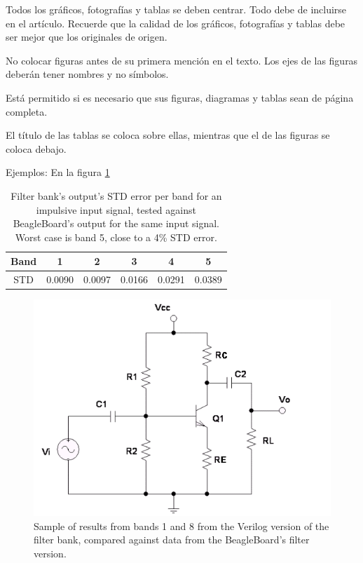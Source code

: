 \documentclass[journal,onecolumn]{IEEEtran}
\begin{document}
Todos los gráficos, fotografías y tablas se deben centrar. Todo debe de incluirse en el artículo. Recuerde que la calidad de los gráficos, fotografías y tablas debe ser mejor que los originales de origen.

No colocar figuras antes de su primera mención en el texto. Los ejes de las figuras deberán tener nombres y no símbolos.

Está permitido si es necesario que sus figuras, diagramas y tablas sean de página completa.

El título de las tablas se coloca sobre ellas, mientras que el de las figuras se coloca debajo.

Ejemplos: En la figura \ref{fig:FiguraCircuito}


\begin{table}[htb]
  \begin{center}
    \caption{Filter bank's output's STD error per band for an impulsive input signal, tested against BeagleBoard's output for the same input signal. Worst case is band 5, close to a 4\% STD error. }
    \label{tab:filter-error}
   
   \begin{tabular}{c | c | c | c | c | c }
      \hline
      Band & 1 & 2 & 3 & 4 & 5 \\
      \hline
       STD & 0.0090 & 0.0097 & 0.0166 & 0.0291 & 0.0389  \\
      \hline
    \end{tabular}
  \end{center}
\end{table}

\begin{figure}[hbtp]
	\centering
	\includegraphics[width = \columnwidth]{imagenes/Circuito.png}
	\caption[Figura3]{Sample of results from bands 1 and 8 from the Verilog version of the filter bank, compared against data from the BeagleBoard's filter version.}
	\label{fig:FiguraCircuito}
\end{figure}
\end{document}
